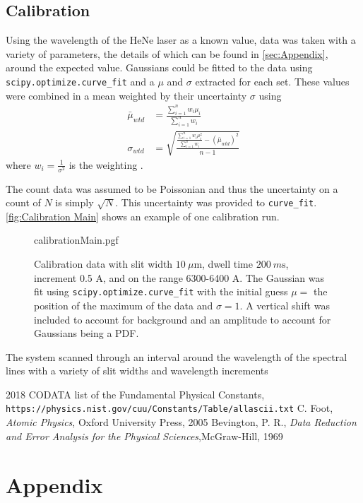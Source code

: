 \documentclass[11pt]{article}
\numberwithin{equation}{section}
\numberwithin{figure}{section}
\numberwithin{table}{section}
\begin{document}
\subsection{Calibration}\label{sec:Calibration}
\par Using the wavelength of the HeNe laser as a known value, data was taken with a variety of parameters, the details of which can be found in \autoref{sec:Appendix}, around the expected value. Gaussians could be fitted to the data using \texttt{scipy.optimize.curve\_fit} and a $\mu$ and $\sigma$ extracted for each set. These values were combined in a mean weighted by their uncertainty $\sigma$ using
\begin{align}
    \bar \mu_{wtd}&=\frac{\sum\limits_{i=1}^nw_i\mu_i}{\sum\limits_{i=1}^nw_i}\label{eqn:Weighted Mean}\\
    \sigma_{wtd}&=\sqrt{\frac{\frac{\sum\limits_{i=1}^nw_i\mu_i^2}{\sum\limits_{i=1}^nw_i}-(\bar\mu_{wtd})^2}{n-1}}\label{eqn:Weighted Mean Uncertainty}
\end{align}
where $w_i=\frac{1}{\sigma^2}$ is the weighting \cite{Data Reduction}. 
\par The count data was assumed to be Poissonian and thus the uncertainty on a count of $N$ is simply $\sqrt{N}$. This uncertainty was provided to \texttt{curve\_fit}. \autoref{fig:Calibration Main} shows an example of one calibration run.

\begin{figure}[H]
    \begin{center}
       {calibrationMain.pgf}
       \caption{Calibration data with slit width $\SI{10}{\mu\m}$, dwell time $\SI{200}{m\second}$, increment 0.5 A, and on the range 6300-6400 A. The Gaussian was fit using \texttt{scipy.optimize.curve\_fit} with the initial guess $\mu=$ the position of the maximum of the data and $\sigma=1$. A vertical shift was included to account for background and an amplitude to account for Gaussians being a PDF.}
       \label{fig:Calibration Main}
    \end{center}
\end{figure}


The system scanned through an interval around the wavelength of the spectral lines with a variety of slit widths and wavelength increments 







\begin{thebibliography}{9}
    2018 CODATA list of the Fundamental Physical Constants, \texttt{https://physics.nist.gov/cuu/Constants/Table/allascii.txt}
    C. Foot, \textit{Atomic Physics}, Oxford University Press, 2005
    Bevington, P. R., \textit{Data Reduction and Error Analysis for the Physical Sciences},McGraw-Hill, 1969
\end{thebibliography}


\newpage
\section{Appendix}\label{sec:Appendix}
\setcounter{figure}{0} \renewcommand{\thefigure}{A.\arabic{figure}}
\end{document}
